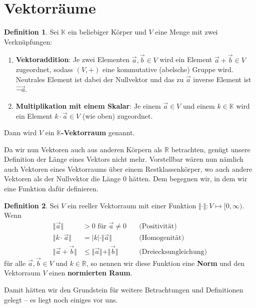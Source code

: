 \documentclass[11pt,a4paper]{scrartcl}
\theoremstyle{remark}
\theoremstyle{definition}
\newtheorem{definition}{Definition}[section]
\begin{document}
\section{Vektorräume}
\begin{definition}
Sei $\mathbb{K}$ ein beliebiger Körper und $V$ eine Menge mit zwei Verknüpfungen:
\begin{enumerate}
\item \textbf{Vektoraddition}: Je zwei Elementen $\vec{a}, \vec{b} \in V$ wird ein Element $\vec{a} + \vec{b} \in V$ zugeordnet, sodass $(V, +)$ eine kommutative ({\glqq}abelsche{\grqq}) Gruppe wird. Neutrales Element ist dabei der Nullvektor und das zu $\vec{a}$ inverse Element ist $\vec{-a}$.
\item \textbf{Multiplikation mit einem Skalar}: Je einem $\vec{a} \in V$ und einem $k \in \mathbb{K}$ wird ein Element $k \cdot \vec{a} \in V$ (wie oben) zugeordnet.
\end{enumerate}
Dann wird $V$ ein \textbf{$\mathbb{K}$-Vektorraum} genannt.
\end{definition}
Da wir nun Vektoren auch aus anderen Körpern als $\mathbb{R}$ betrachten, genügt unsere Definition der Länge eines Vektors nicht mehr. Vorstellbar wären nun nämlich auch Vektoren eines Vektorraums über einem Restklassenkörper, wo auch andere Vektoren als der Nullvektor die Länge $0$ hätten. Dem begegnen wir, in dem wir eine Funktion dafür definieren.
\begin{definition}
Sei $V$ ein reeller Vektorraum mit einer Funktion $\Vert \cdot \Vert : V \mapsto [0, \infty{)}$. \\Wenn 
\begin{align*}
\Vert \vec{a} \Vert &> 0 \text{ für } \vec{a} \neq 0 \quad &\text{(Positivität)}\\
\Vert k \cdot \vec{a} \Vert &= \vert k \vert \cdot \Vert \vec{a} \Vert & \text{(Homogenität)} \\
\Vert \vec{a} + \vec{b} \Vert &\leq \Vert \vec{a} \Vert + \Vert \vec{b} \Vert & \text{(Dreiecksungleichung)}
\end{align*}
für alle $\vec{a}, \vec{b} \in V$ und $k \in \mathbb{R}$, so nennen wir diese Funktion eine \textbf{Norm} und den Vektorraum $V$ einen \textbf{normierten Raum}.
\end{definition}
Damit hätten wir den Grundstein für weitere Betrachtungen und Definitionen gelegt -- es liegt noch einiges vor uns.
\end{document}

